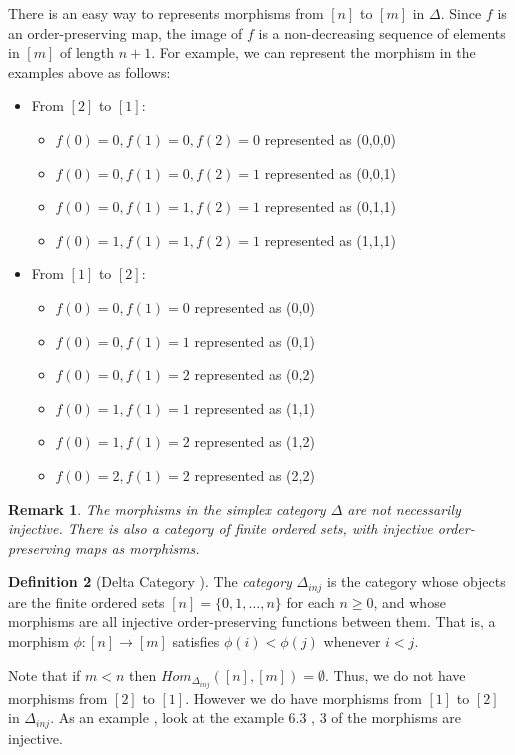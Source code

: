 \documentclass[11pt]{article}
\theoremstyle{definition}
\newtheorem{definition}{Definition}[section]
\theoremstyle{plain}
\newtheorem{remark}[definition]{Remark}
\begin{document}
There is an easy way to represents morphisms from $[n]$ to $[m]$ in $\Delta$. Since $f$ is an order-preserving map, the image of $f$ is a non-decreasing sequence of elements in $[m]$ of length $n+1$.
For example, we can represent the morphism in the examples above as follows:
\begin{itemize}
    \item From $[2]$ to $[1]$:
          \begin{itemize}
              \item $f(0)=0, f(1)=0, f(2)=0$  represented as (0,0,0)
              \item $f(0)=0, f(1)=0, f(2)=1$  represented as (0,0,1)
              \item $f(0)=0, f(1)=1, f(2)=1$  represented as (0,1,1)
              \item $f(0)=1, f(1)=1, f(2)=1$  represented as (1,1,1)
          \end{itemize}
    \item From $[1]$ to $[2]$:
          \begin{itemize}
              \item $f(0)=0, f(1)=0$  represented as (0,0)
              \item $f(0)=0, f(1)=1$  represented as (0,1)
              \item $f(0)=0, f(1)=2$  represented as (0,2)
              \item $f(0)=1, f(1)=1$  represented as (1,1)
              \item $f(0)=1, f(1)=2$  represented as (1,2)
              \item $f(0)=2, f(1)=2$  represented as (2,2)
          \end{itemize}

\end{itemize}



\begin{remark}
    The morphisms in the simplex category $\Delta$ are not necessarily injective. There is also a category of finite ordered sets, with injective order-preserving maps as morphisms.
\end{remark}

\begin{definition}[Delta Category ]
    The \emph{category} $\Delta_{inj} $ is the category whose objects are the finite ordered sets $[n] = \{0,1,\dots,n\}$ for each $n \geq 0$, and whose morphisms are all injective order-preserving  functions between them. That is, a morphism $\phi : [n] \to [m]$ satisfies $\phi(i) < \phi(j)$ whenever $i < j$.
\end{definition}
Note that if $ m<n$ then $Hom_{\Delta_{inj}}([n],[m]) = \emptyset$.
Thus, we do not have morphisms from $[2]$ to $[1]$. However we do have morphisms from $[1]$ to $[2]$ in $\Delta_{inj}$. As an example , look at the example 6.3 , 3 of the morphisms are injective.
\end{document}
